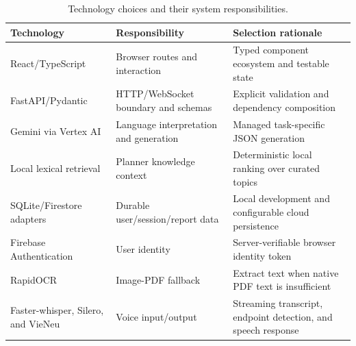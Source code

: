 \begin{table}[htbp]\centering
\caption{Technology choices and their system responsibilities.}\label{tab:technology-summary}
\begin{tabularx}{\textwidth}{p{}YY}\toprule
Technology & Responsibility & Selection rationale\\ \midrule
React/TypeScript & Browser routes and interaction & Typed component ecosystem and testable state\\
FastAPI/Pydantic & HTTP/WebSocket boundary and schemas & Explicit validation and dependency composition\\
Gemini via Vertex AI & Language interpretation and generation & Managed task-specific JSON generation\\
Local lexical retrieval & Planner knowledge context & Deterministic local ranking over curated topics\\
SQLite/Firestore adapters & Durable user/session/report data & Local development and configurable cloud persistence\\
Firebase Authentication & User identity & Server-verifiable browser identity token\\
RapidOCR & Image-PDF fallback & Extract text when native PDF text is insufficient\\
Faster-whisper, Silero, and VieNeu & Voice input/output & Streaming transcript, endpoint detection, and speech response\\
\bottomrule\end{tabularx}
\end{table}
